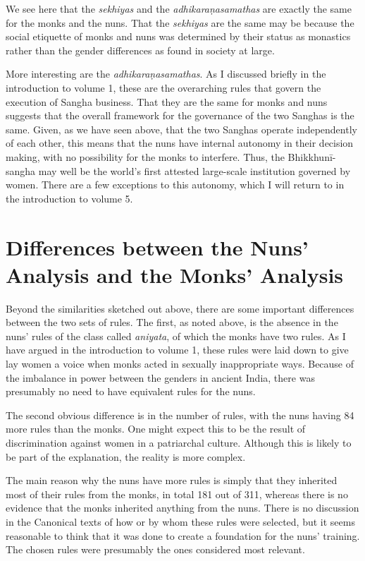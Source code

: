 \documentclass[12pt,openany]{book}%
\begin{document}
We see here that the \textit{sekhiyas} and the \textit{\textsanskrit{adhikaraṇasamathas}} are exactly the same for the monks and the nuns. That the \textit{sekhiyas} are the same may be because the social etiquette of monks and nuns was determined by their status as monastics rather than the gender differences as found in society at large.

More interesting are the \textit{\textsanskrit{adhikaraṇasamathas}}. As I discussed briefly in the introduction to volume 1, these are the overarching rules that govern the execution of Sangha business. That they are the same for monks and nuns suggests that the overall framework for the governance of the two Sanghas is the same. Given, as we have seen above, that the two Sanghas operate independently of each other, this means that the nuns have internal autonomy in their decision making, with no possibility for the monks to interfere. Thus, the \textsanskrit{Bhikkhunī}-sangha may well be the world’s first attested large-scale institution governed by women. There are a few exceptions to this autonomy, which I will return to in the introduction to volume 5.

\section*{Differences between the Nuns’ Analysis and the Monks’ Analysis}

Beyond the similarities sketched out above, there are some important differences between the two sets of rules. The first, as noted above, is the absence in the nuns’ rules of the class called \textit{aniyata}, of which the monks have two rules. As I have argued in the introduction to volume 1, these rules were laid down to give lay women a voice when monks acted in sexually inappropriate ways. Because of the imbalance in power between the genders in ancient India, there was presumably no need to have equivalent rules for the nuns.

The second obvious difference is in the number of rules, with the nuns having 84 more rules than the monks. One might expect this to be the result of discrimination against women in a patriarchal culture. Although this is likely to be part of the explanation, the reality is more complex.

The main reason why the nuns have more rules is simply that they inherited most of their rules from the monks, in total 181 out of 311, whereas there is no evidence that the monks inherited anything from the nuns. There is no discussion in the Canonical texts of how or by whom these rules were selected, but it seems reasonable to think that it was done to create a foundation for the nuns’ training. The chosen rules were presumably the ones considered most relevant.
\end{document}

